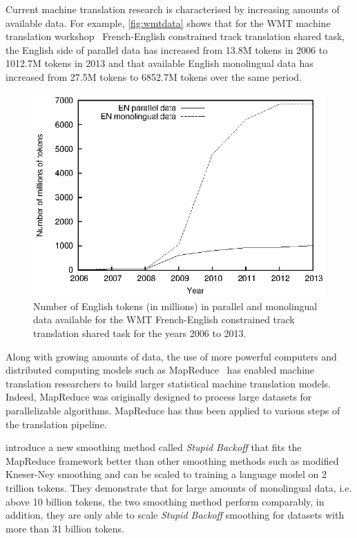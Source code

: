 Current machine translation research is characterised by increasing amounts
of available data. For example, \autoref{fig:wmtdata} shows that
for the WMT machine translation
workshop~\citep{bojar-buck-callisonburch-federmann-haddow-koehn-monz-post-soricut-specia:2013:WMT}
French-English constrained track translation shared task, the English side of parallel
data has increased from 13.8M tokens in 2006 to 1012.7M tokens in 2013 and that
available English monolingual data has increased from 27.5M tokens to 6852.7M
tokens over the same period.
%
\begin{figure}
  \begin{center}
    \includegraphics{figures/wmt/wmtdata.eps}
    \caption{Number of English tokens (in millions) in parallel and monolingual
      data available for the WMT French-English constrained track translation
      shared task for the years 2006 to 2013.}
    \label{fig:wmtdata}
  \end{center}
\end{figure}
%

Along with growing amounts of data, the use of more powerful computers
and distributed computing models such as
MapReduce~\citep{dean-ghemawat:2008:ACM,lin-dyer:2010:book} has enabled machine
translation researchers to build larger statistical machine translation models.
Indeed, MapReduce was originally designed to process large datasets for parallelizable
algorithms. MapReduce has thus been applied to various steps of the
translation pipeline.

\citet{brants-popat-xu-och-dean:2007:EMNLP-CoNLL}
introduce a new smoothing method called \emph{Stupid Backoff} that fits
the MapReduce framework better than other smoothing methods such
as modified Kneser-Ney smoothing and can be scaled
to training a language model on 2 trillion tokens. They demonstrate
that for large amounts of monolingual data, i.e. above 10 billion
tokens, the two smoothing method perform comparably, in addition, they
are only able to scale \emph{Stupid Backoff} smoothing for datasets
with more than 31 billion tokens.

